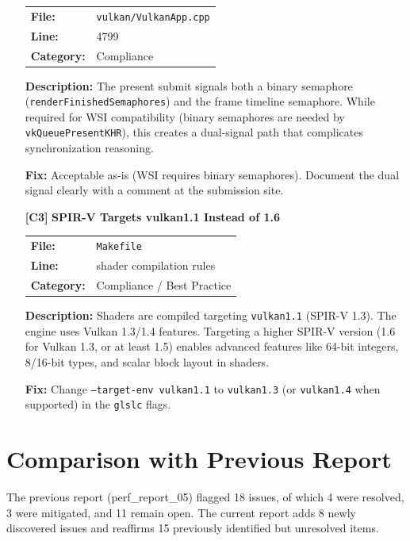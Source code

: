 \documentclass[a4paper,12pt]{article}
\newcommand{\severitybox}[2]{%
  \colorbox{#1}{\makebox[2.5cm][c]{\textcolor{white}{\textbf{#2}}}}%
}
\begin{document}
\begin{enumerate}[leftmargin=*]
  \begin{tabular}{ll}
    \textbf{File:} & \texttt{vulkan/VulkanApp.cpp} \\
    \textbf{Line:} & 4799 \\
    \textbf{Category:} & Compliance \\
  \end{tabular}

  \textbf{Description:}
  The present submit signals both a binary semaphore
  (\texttt{renderFinishedSemaphores}) and the frame timeline semaphore.
  While required for WSI compatibility (binary semaphores are needed by
  \texttt{vkQueuePresentKHR}), this creates a dual-signal path that
  complicates synchronization reasoning.

  \textbf{Fix:}
  Acceptable as-is (WSI requires binary semaphores). Document the dual
  signal clearly with a comment at the submission site.

\item[\textbf{[C3]}] \textbf{SPIR-V Targets vulkan1.1 Instead of 1.6}
  \hfill \severitybox{lowcolor}{LOW}

  \begin{tabular}{ll}
    \textbf{File:} & \texttt{Makefile} \\
    \textbf{Line:} & shader compilation rules \\
    \textbf{Category:} & Compliance / Best Practice \\
  \end{tabular}

  \textbf{Description:}
  Shaders are compiled targeting \texttt{vulkan1.1} (SPIR-V 1.3).
  The engine uses Vulkan 1.3/1.4 features. Targeting a higher SPIR-V
  version (1.6 for Vulkan 1.3, or at least 1.5) enables advanced
  features like 64-bit integers, 8/16-bit types, and scalar block layout
  in shaders.

  \textbf{Fix:}
  Change \texttt{--target-env vulkan1.1} to \texttt{vulkan1.3} (or
  \texttt{vulkan1.4} when supported) in the \texttt{glslc} flags.

\end{enumerate}

\newpage

\section{Comparison with Previous Report}

The previous report (perf\_report\_05) flagged 18 issues, of which 4 were resolved,
3 were mitigated, and 11 remain open. The current report adds 8 newly discovered
issues and reaffirms 15 previously identified but unresolved items.
\end{document}
